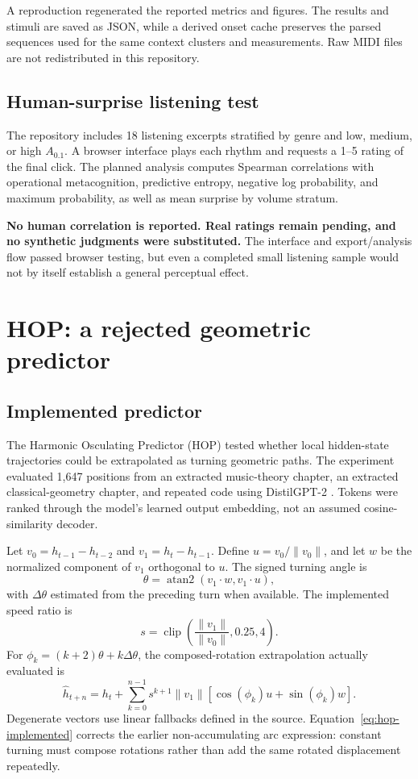 \documentclass[11pt,a4paper]{article}
\begin{document}
A reproduction regenerated the reported metrics and figures. The results and stimuli are saved as JSON, while a derived onset cache preserves the parsed sequences used for the same context clusters and measurements. Raw MIDI files are not redistributed in this repository.

\subsection{Human-surprise listening test}
The repository includes 18 listening excerpts stratified by genre and low, medium, or high $A_{0.1}$. A browser interface plays each rhythm and requests a 1--5 rating of the final click. The planned analysis computes Spearman correlations with operational metacognition, predictive entropy, negative log probability, and maximum probability, as well as mean surprise by volume stratum.

\textbf{No human correlation is reported. Real ratings remain pending, and no synthetic judgments were substituted.} The interface and export/analysis flow passed browser testing, but even a completed small listening sample would not by itself establish a general perceptual effect.

\section{HOP: a rejected geometric predictor}
\subsection{Implemented predictor}
The Harmonic Osculating Predictor (HOP) tested whether local hidden-state trajectories could be extrapolated as turning geometric paths. The experiment evaluated 1,647 positions from an extracted music-theory chapter, an extracted classical-geometry chapter, and repeated code using DistilGPT-2 \cite{distilgpt2}. Tokens were ranked through the model's learned output embedding, not an assumed cosine-similarity decoder.

Let $v_0=h_{t-1}-h_{t-2}$ and $v_1=h_t-h_{t-1}$. Define $u=v_0/\lVert v_0\rVert$, and let $w$ be the normalized component of $v_1$ orthogonal to $u$. The signed turning angle is
\begin{equation}
\theta=\operatorname{atan2}(v_1\cdot w,v_1\cdot u),
\end{equation}
with $\Delta\theta$ estimated from the preceding turn when available. The implemented speed ratio is
\begin{equation}
s=\operatorname{clip}\!\left(\frac{\lVert v_1\rVert}{\lVert v_0\rVert},0.25,4\right).
\end{equation}
For $\phi_k=(k+2)\theta+k\Delta\theta$, the composed-rotation extrapolation actually evaluated is
\begin{equation}
\hat h_{t+n}=h_t+\sum_{k=0}^{n-1}s^{k+1}\lVert v_1\rVert
\left[\cos(\phi_k)u+\sin(\phi_k)w\right].
\label{eq:hop-implemented}
\end{equation}
Degenerate vectors use linear fallbacks defined in the source. Equation~\ref{eq:hop-implemented} corrects the earlier non-accumulating arc expression: constant turning must compose rotations rather than add the same rotated displacement repeatedly.
\end{document}
